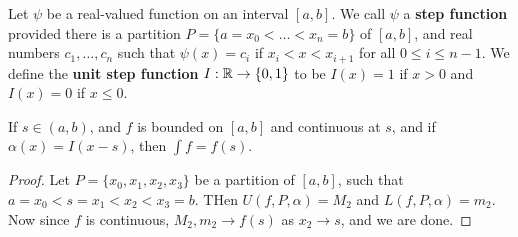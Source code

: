 \begin{definition}
    Let $\psi$ be a real-valued function on an interval $[a,b]$. We call $\psi$
    a  \textbf{step function} provided there is a partition
    $P=\{a=x_0<\dots<x_n=b\}$ of $[a,b]$, and real numbers $c_1, \dots, c_n$
    such that $\psi(x)=c_i$  if $x_i<x<x_{i+1}$ for all $0 \leq i \leq n-1$. We
    define the \textbf{unit step function} $I: \mathbb{R} \rightarrow \{0,1\}$ to be
    $I(x)=1$ if  $x>0$ and  $I(x)=0$ if  $x \leq 0$.
\end{definition}

\begin{theorem}\label{7.2.3}
    If $s \in (a,b)$, and $f$ is bounded on  $[a,b]$ and continuous at $s$, and
    if $\alpha(x)=I(x-s)$, then  $\int{f}=f(s)$.
\end{theorem}
\begin{proof}
    Let $P=\{x_0,x_1,x_2,x_3\}$ be a partition of $[a,b]$, such that
    $a=x_0<s=x_1<x_2<x_3=b$. THen $U(f,P,\alpha)=M_2$ and  $L(f,P,\alpha)=m_2$.
    Now since $f$ is continuous, $ M_2,m_2 \rightarrow f(s)$ as $ x_2
    \rightarrow s$, and we are done.
\end{proof}


